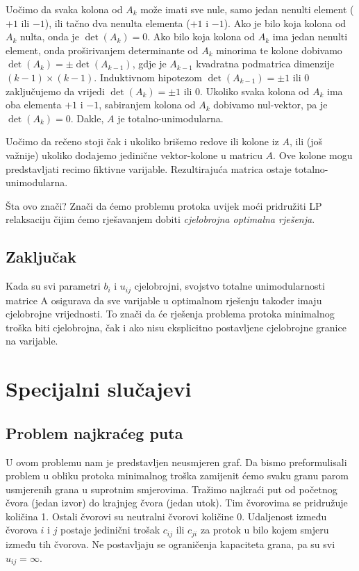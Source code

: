 \documentclass[11pt, a4paper]{article}
\begin{document}
	Uočimo da svaka kolona od $A_{k}$ može imati sve nule, samo jedan nenulti element ($+1$ ili $-1$), ili tačno dva nenulta elementa ($+1$ i $-1$). Ako je bilo koja kolona od $A_{k}$ nulta, onda je $\det(A_k) = 0$. Ako bilo koja kolona od $A_k$ ima jedan nenulti element, onda proširivanjem determinante od $A_k$ minorima te kolone dobivamo $\det(A_k) = \pm \det(A_{k-1})$, gdje je $A_{k-1}$ kvadratna podmatrica dimenzije $(k-1) \times (k-1)$. Induktivnom hipotezom $\det(A_{k-1}) = \pm 1$ ili $0$ zaključujemo da vrijedi $\det(A_k) = \pm 1$ ili $0$. Ukoliko svaka kolona od $A_k$ ima oba elementa $+1$ i $-1$, sabiranjem kolona od $A_k$ dobivamo nul-vektor, pa je $\det(A_k) = 0$. Dakle, $A$ je totalno-unimodularna.
	
	Uočimo da rečeno stoji čak i ukoliko brišemo redove ili kolone iz $A$, ili (još važnije) ukoliko dodajemo jedinične vektor-kolone u matricu $A$. Ove kolone mogu predstavljati recimo fiktivne varijable. Rezultirajuća matrica ostaje totalno-unimodularna.
	
	Šta ovo znači? Znači da ćemo problemu protoka uvijek moći pridružiti LP relaksaciju čijim ćemo rješavanjem dobiti \textit{cjelobrojna optimalna rješenja}.
	
	\subsection*{Zaključak}
	
	Kada su svi parametri \( b_i \) i \( u_{ij} \) cjelobrojni, svojstvo totalne unimodularnosti matrice A osigurava da sve varijable u optimalnom rješenju također imaju cjelobrojne vrijednosti. To znači da će rješenja problema protoka minimalnog troška biti cjelobrojna, čak i ako nisu eksplicitno postavljene cjelobrojne granice na varijable.
	
	\newpage
	\section{Specijalni slučajevi}
	
		\subsection*{Problem najkraćeg puta}
	
		U ovom problemu nam je predstavljen neusmjeren graf. Da bismo preformulisali problem u obliku protoka minimalnog troška zamijenit ćemo svaku granu parom usmjerenih grana u suprotnim smjerovima. Tražimo najkraći put od početnog čvora (jedan izvor) do krajnjeg čvora (jedan utok). Tim čvorovima se pridružuje količina 1. Ostali čvorovi su neutralni čvorovi količine 0. Udaljenost između čvorova \(i\) i \(j\) postaje jedinični trošak \(c_{ij}\) ili \(c_{ji}\) za protok u bilo kojem smjeru između tih čvorova. Ne postavljaju se ograničenja kapaciteta grana, pa su svi \(u_{ij} = \infty \).
		
\end{document}
